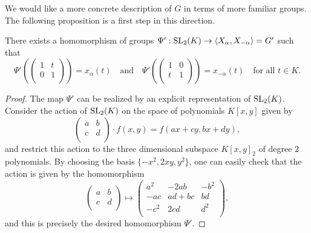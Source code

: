 We would like a more concrete description of $G$ in terms of more familiar groups. The following proposition is a first step in this direction.

\begin{proposition}\label{prop:homSL2version1}
    There exists a homomorphism of groups 
    $\Psi':\mathrm{SL}_2(K)\rightarrow\langle X_\alpha,X_{-\alpha}\rangle=G'$
    such that 
    $$\Psi'\left(\begin{pmatrix}
        1 & t\\
        0 & 1\\
    \end{pmatrix}\right)=x_\alpha(t)\quad\text{and}\quad\Psi'\left(\begin{pmatrix}
        1 & 0\\
        t & 1\\
    \end{pmatrix}\right)=x_{-\alpha}(t)\quad\text{for all $t\in K$}.$$
\end{proposition}
\begin{proof}
    The map $\Psi'$ can be realized by an explicit representation of $\mathrm{SL}_2(K)$. Consider the action of $\mathrm{SL}_2(K)$ on the space of polynomials $K[x,y]$ given by 
    $$\begin{pmatrix}
        a & b\\
        c & d\\
    \end{pmatrix}\cdot f(x,y)=f(ax+cy,bx+dy),$$
    and restrict this action to the three dimensional subspace $K[x,y]_2$ of degree $2$ polynomials. By choosing the basis $\{-x^2,2xy,y^2\}$, one can easily check that the action is given by the homomorphism
    $$\begin{pmatrix}
        a& b\\
        c&d\\
    \end{pmatrix}\longmapsto\begin{pmatrix}
        a^2 & -2ab & -b^2\\
        -ac & ad+bc & bd\\
        -c^2 & 2cd & d^2\\
    \end{pmatrix},$$
    and this is precisely the desired homomorphism $\Psi'$.
\end{proof}

